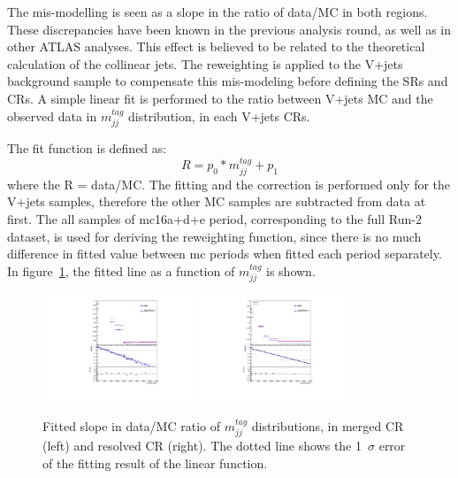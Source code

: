 The mis-modelling is seen as a slope in the ratio of data/MC in both regions.
These discrepancies have been known in the previous analysis round, as well as in other ATLAS analyses. 
This effect is believed to be related to the theoretical calculation of the collinear jets.
The reweighting is applied to the V+jets background sample to compensate this mis-modeling before defining the SRs and CRs. 
A simple linear fit is performed to the ratio between V+jets MC and the observed data in $m^{tag}_{jj}$ distribution, in each V+jets CRs. 

The fit function is defined as:
\begin{equation}
\label{eqn:reweight}
R=p_{0} * m_{jj}^{tag}+p_{1}
\end{equation}
where the R = data/MC.
The fitting and the correction is performed only for the V+jets samples, therefore the other MC samples are subtracted from data at first. 
The all samples of mc16a+d+e period, corresponding to the full Run-2 dataset, is used for deriving the reweighting function, since there is no much difference in fitted value between mc periods when fitted each period separately. 
In figure~\ref{fig:LinearFit}, the fitted line as a function of $m^{tag}_{jj}$ is shown. 

\begin{figure}[ht]
    \centering
    \includegraphics[width=0.40\textwidth]{figures/2lep/reweighting/MTagMerJets_0ptag1pfat0pjet_0ptv_CRVjet_finerbin}
    \includegraphics[width=0.40\textwidth]{figures/2lep/reweighting/MTagResJets_0ptag2pjet_0ptv_CRVjet_Fid_finerbin}
    \caption{ Fitted slope in data/MC ratio of $m^{tag}_{jj}$ distributions, in merged CR (left) and resolved CR (right). The dotted line shows the 1~$\sigma$ error of the fitting result of the linear function. }
    \label{fig:LinearFit}
\end{figure}

